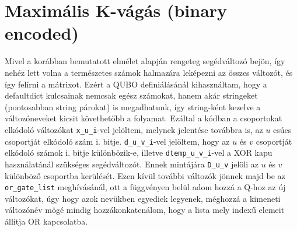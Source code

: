%

\section{Maximális K-vágás (binary encoded)}\label{sec:practiceBinary}

Mivel a korábban bemutatott elmélet alapján rengeteg segédváltozó bejön, így nehéz lett volna a természetes számok halmazára leképezni az összes változót, és így felírni a mátrixot. Ezért a QUBO definiálásánál kihasználtam, hogy a defaultdict kulcsainak nemcsak egész számokat, hanem akár stringeket (pontosabban string párokat) is megadhatunk, így string-ként kezelve a változóneveket kicsit követhetőbb a folyamat. Ezáltal a kódban a csoportokat elkódoló változókat \verb+x_u_i+-vel jelöltem, melynek jelentése továbbra is, az $u$ csúcs csoportját elkódoló szám i. bitje. \verb+d_u_v_i+-vel jelöltem, hogy az $u$ és $v$ csoportját elkódoló számok i. bitje különbözik-e, illetve \verb+dtemp_u_v_i+-vel a XOR kapu használatánál szükséges segédváltozót. Ennek mintájára \verb+D_u_v+ jelöli az $u$ és $v$ különböző csoportba kerülését. Ezen kívül további változók jönnek majd be az \verb+or_gate_list+ meghívásánál, ott a függvényen belül adom hozzá a Q-hoz az új változókat, úgy hogy azok nevükben egyediek legyenek, méghozzá a kimeneti változónév mögé mindig hozzákonkatenálom, hogy a lista mely indexű elemeit állítja OR kapcsolatba.

